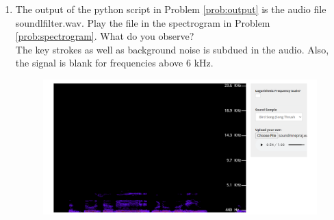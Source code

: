 \documentclass[journal, 12pt, twocolumn]{IEEEtran}
\renewcommand\thesection{\arabic{section}}
\begin{document}
\begin{enumerate}[label=\thesection.\arabic*
		,ref=\thesection.\theenumi]
	\item
	      The output of the python script in Problem \ref{prob:output} is the audio file soundlfilter.wav. Play the file in the spectrogram in Problem \ref{prob:spectrogram}. What do you observe?
	      \\
	      \solution The key strokes as well as background noise is subdued in the audio.  Also,  the signal is blank for frequencies above 6 kHz.
	      \begin{figure}[h]
		      \centering
		      \includegraphics[width=\columnwidth]{figs/soundlfilter.png}
		      \caption{}
		      \label{fig:filteraudiospectrum}
	      \end{figure}

\end{enumerate}
\end{document}
